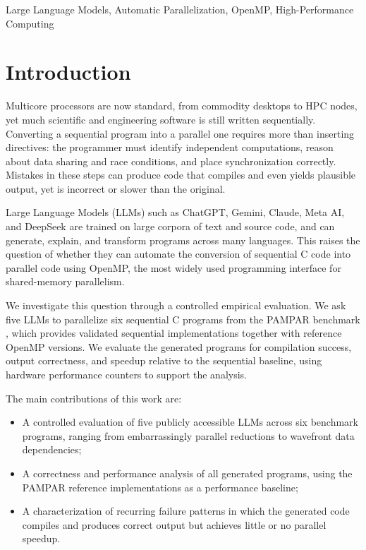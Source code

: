 \documentclass[conference]{IEEEtran}
\begin{document}
\begin{IEEEkeywords}
Large Language Models, Automatic Parallelization, OpenMP, High-Performance Computing
\end{IEEEkeywords}

\section{Introduction}

Multicore processors are now standard, from commodity desktops to HPC nodes, yet much scientific and engineering software is still written sequentially. 
Converting a sequential program into a parallel one requires more than inserting directives: the programmer must identify independent computations, reason about data sharing and race conditions, and place synchronization correctly. 
Mistakes in these steps can produce code that compiles and even yields plausible output, yet is incorrect or slower than the original.

Large Language Models (LLMs) such as ChatGPT, Gemini, Claude, Meta AI, and DeepSeek are trained on large corpora of text and source code, and can generate, explain, and transform programs across many languages. 
This raises the question of whether they can automate the conversion of sequential C code into parallel code using OpenMP, the most widely used programming interface for shared-memory parallelism.

We investigate this question through a controlled empirical evaluation. 
We ask five LLMs to parallelize six sequential C programs from the PAMPAR benchmark \cite{GARCIA:PAMPAR:2020}, which provides validated sequential implementations together with reference OpenMP versions. 
We evaluate the generated programs for compilation success, output correctness, and speedup relative to the sequential baseline, using hardware performance counters to support the analysis.

The main contributions of this work are: 
\begin{itemize}
\item A controlled evaluation of five publicly accessible LLMs across six benchmark programs, ranging from embarrassingly parallel reductions to wavefront data dependencies;
\item A correctness and performance analysis of all generated programs, using the PAMPAR reference implementations as a performance baseline;
\item A characterization of recurring failure patterns in which the generated code compiles and produces correct output but achieves little or no parallel speedup.
\end{itemize}
\end{document}
